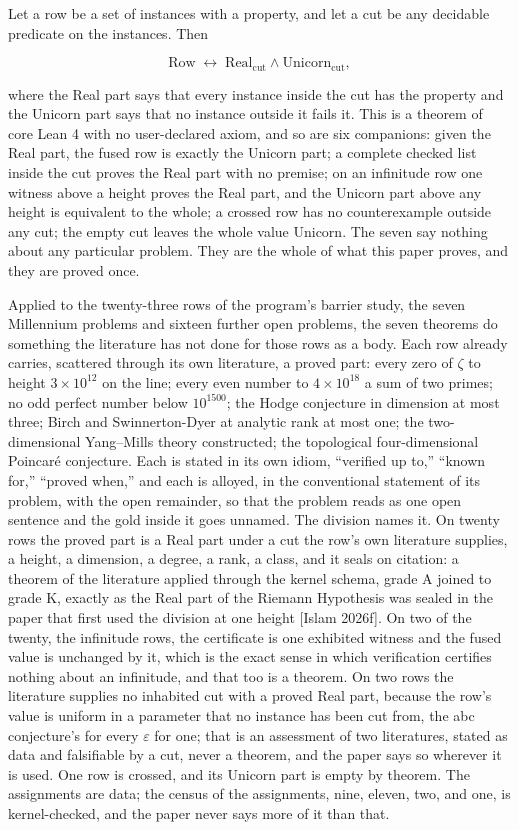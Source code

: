 \documentclass[10pt,twocolumn]{article}
\begin{document}
Let a row be a set of instances with a property, and let a cut be any
decidable predicate on the instances. Then

\[\mathrm{Row} \;\leftrightarrow\; \mathrm{Real}_{\mathrm{cut}} \wedge \mathrm{Unicorn}_{\mathrm{cut}},\]

where the Real part says that every instance inside the cut has the
property and the Unicorn part says that no instance outside it fails it.
This is a theorem of core Lean 4 with no user-declared axiom, and so are
six companions: given the Real part, the fused row is exactly the
Unicorn part; a complete checked list inside the cut proves the Real
part with no premise; on an infinitude row one witness above a height
proves the Real part, and the Unicorn part above any height is
equivalent to the whole; a crossed row has no counterexample outside any
cut; the empty cut leaves the whole value Unicorn. The seven say nothing
about any particular problem. They are the whole of what this paper
proves, and they are proved once.

Applied to the twenty-three rows of the program's barrier study, the
seven Millennium problems and sixteen further open problems, the seven
theorems do something the literature has not done for those rows as a
body. Each row already carries, scattered through its own literature, a
proved part: every zero of \(\zeta\) to height \(3 \times 10^{12}\) on
the line; every even number to \(4 \times 10^{18}\) a sum of two primes;
no odd perfect number below \(10^{1500}\); the Hodge conjecture in
dimension at most three; Birch and Swinnerton-Dyer at analytic rank at
most one; the two-dimensional Yang--Mills theory constructed; the
topological four-dimensional Poincaré conjecture. Each is stated in its
own idiom, ``verified up to,'' ``known for,'' ``proved when,'' and each
is alloyed, in the conventional statement of its problem, with the open
remainder, so that the problem reads as one open sentence and the gold
inside it goes unnamed. The division names it. On twenty rows the proved
part is a Real part under a cut the row's own literature supplies, a
height, a dimension, a degree, a rank, a class, and it seals on
citation: a theorem of the literature applied through the kernel schema,
grade A joined to grade K, exactly as the Real part of the Riemann
Hypothesis was sealed in the paper that first used the division at one
height {[}Islam 2026f{]}. On two of the twenty, the infinitude rows, the
certificate is one exhibited witness and the fused value is unchanged by
it, which is the exact sense in which verification certifies nothing
about an infinitude, and that too is a theorem. On two rows the
literature supplies no inhabited cut with a proved Real part, because
the row's value is uniform in a parameter that no instance has been cut
from, the abc conjecture's for every \(\varepsilon\) for one; that is an
assessment of two literatures, stated as data and falsifiable by a cut,
never a theorem, and the paper says so wherever it is used. One row is
crossed, and its Unicorn part is empty by theorem. The assignments are
data; the census of the assignments, nine, eleven, two, and one, is
kernel-checked, and the paper never says more of it than that.
\end{document}

